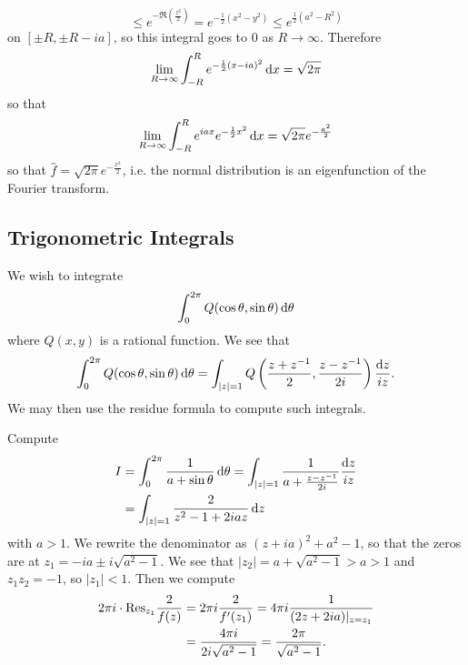 \begin{xmpl}
\begin{enumerate}
{$$      \leq e^{-\Re(\frac{z^2}{2})}
      =    e^{-\frac{1}{2}(x^2 - y^2)}
      \leq e^{\frac{1}{2}(a^2 - R^2)}
      $$
      on $[\pm R, \pm R - ia]$, so this integral goes to 0
      as $R \to \infty$. Therefore
      $$
      \lim_{R \to \infty}
        \int_{-R}^R
          e^{-\frac{1}{2}(x - i a)^2}
          \mathop{}\!\mathrm{d} x
      = \sqrt{2 \pi}
      $$
      so that
      $$
      \lim_{R \to \infty}
        \int_{-R}^R
          e^{i a x}
          e^{-\frac{1}{2}x^2}
          \mathop{}\!\mathrm{d} x
      = \sqrt{2 \pi} e^{-\frac{a^2}{2}}
      $$
      so that $\hat{f} = \sqrt{2 \pi} e^{-\frac{x^2}{2}}$, i.e.
      the normal distribution is an eigenfunction of the Fourier
      transform.
    }
  \end{enumerate}
\end{xmpl}

\subsection{Trigonometric Integrals}
We wish to integrate
$$
\int_0^{2\pi} Q(\cos \theta, \sin \theta) \mathop{}\!\mathrm{d} \theta
$$
where $Q(x, y)$ is a rational function. We see that
$$
   \int_0^{2\pi}
     Q(\cos \theta, \sin \theta)
     \mathop{}\!\mathrm{d} \theta
=  \int_{|z| = 1}
     Q\left(
       \frac{z + z^{-1}}{2},
       \frac{z - z^{-1}}{2 i}
      \right)
     \frac{\mathop{}\!\mathrm{d} z}
          {i z}.
$$
We may then use the residue formula to compute such integrals.

\begin{xmpl}
  Compute
  \begin{align*}
  I &= \int_0^{2\pi}
         \frac{1}{a + \sin \theta}
         \mathop{}\!\mathrm{d} \theta
     = \int_{|z| = 1}
         \frac{1}{a + \frac{z - z^{-1}}{2i}}
         \frac{\mathop{}\!\mathrm{d} z}{i z} \\
    &= \int_{|z| = 1}
         \frac{2}{z^2 - 1 + 2iaz}
         \mathop{}\!\mathrm{d} z
  \end{align*}
  with $a > 1$. We rewrite the
  denominator as $(z+ia)^2 + a^2 - 1$, so that the
  zeros are at $z_1 = -ia \pm i \sqrt{a^2 - 1}$. We
  see that $|z_2| = a + \sqrt{a^2 - 1} > a > 1$ and
  $z_1 z_2 = -1$, so $|z_1| < 1$. Then we compute
  \begin{align*}
     2 \pi i \cdot \mathrm{Res}_{z_1} \frac{2}{f(z)}
  &= 2 \pi i \frac{2}{f^\prime(z_1)}
   = 4 \pi i \frac{1}{(2z + 2ia)|_{z = z_1}} \\
  &= \frac{4 \pi i}{2 i \sqrt{a^2 - 1}}
   = \frac{2 \pi}{\sqrt{a^2 - 1}}.
  \end{align*}
\end{xmpl}


